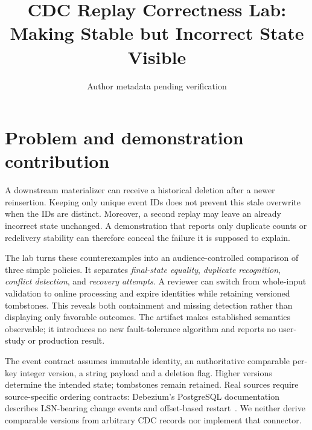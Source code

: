 \documentclass[sigconf,9pt,review]{acmart}
\title{CDC Replay Correctness Lab: Making Stable but Incorrect State Visible}
\author{Author metadata pending verification}
\affiliation{\institution{Affiliation pending verification}\country{United States}}
\begin{document}
\maketitle
\section{Problem and demonstration contribution}
A downstream materializer can receive a historical deletion after a newer reinsertion.
Keeping only unique event IDs does not prevent this stale overwrite when the IDs
are distinct. Moreover, a second replay may leave an already incorrect state unchanged.
A demonstration that reports only duplicate counts or redelivery stability can
therefore conceal the failure it is supposed to explain.

The lab turns these counterexamples into an audience-controlled comparison of three
simple policies. It separates \emph{final-state equality}, \emph{duplicate recognition},
\emph{conflict detection}, and \emph{recovery attempts}. A reviewer can switch from
whole-input validation to online processing and expire identities while retaining
versioned tombstones. This reveals both containment and missing detection rather
than displaying only favorable outcomes. The artifact makes established semantics
observable; it introduces no new fault-tolerance algorithm and reports no user-study
or production result.

The event contract assumes immutable identity, an authoritative comparable per-key
integer version, a string payload and a deletion flag. Higher versions determine the
intended state; tombstones remain retained. Real sources require source-specific
ordering contracts: Debezium's PostgreSQL documentation describes LSN-bearing change
events and offset-based restart~\cite{debezium}. We neither derive comparable versions
from arbitrary CDC records nor implement that connector.
\end{document}
